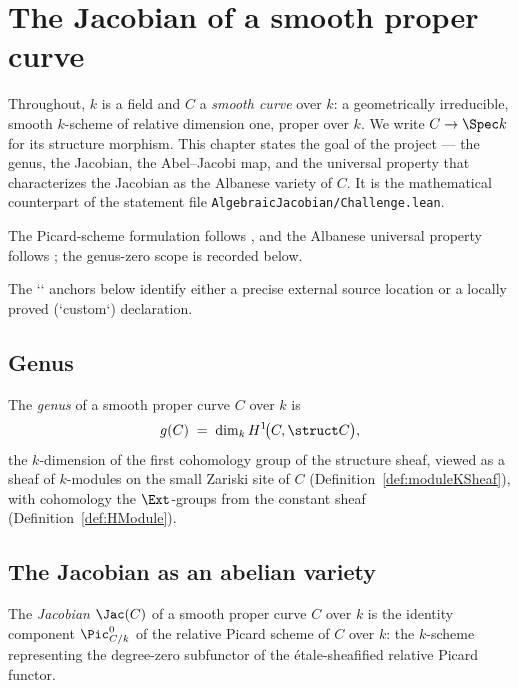 \chapter{The Jacobian of a smooth proper curve}
\label{chap:Challenge}

Throughout, \(k\) is a field and \(C\) a \emph{smooth curve} over \(k\): a geometrically
irreducible, smooth \(k\)-scheme of relative dimension one, proper over \(k\). We write
\(C \to \Spec k\) for its structure morphism. This chapter states the goal of the project — the
genus, the Jacobian, the Abel--Jacobi map, and the universal property that characterizes the
Jacobian as the Albanese variety of \(C\). It is the mathematical counterpart of the statement file
\texttt{AlgebraicJacobian/Challenge.lean}.

The Picard-scheme formulation follows \cite{kleiman-picard}, and the Albanese universal
property follows \cite{milne-av}; the genus-zero scope is recorded below.

The `\dcref` anchors below identify either a precise external source location or a locally
proved (`custom`) declaration.

\section{Genus}

\begin{definition}[Genus]
  \label{def:genus}
  \leanok
  The \emph{genus} of a smooth proper curve \(C\) over \(k\) is
  \[
    g(C) \;=\; \dim_k H^1\!\bigl(C, \struct C\bigr),
  \]
  the \(k\)-dimension of the first cohomology group of the structure sheaf, viewed as a sheaf
  of \(k\)-modules on the small Zariski site of \(C\) (Definition~\ref{def:moduleKSheaf}),
  with cohomology the \(\Ext\)-groups from the constant sheaf
  (Definition~\ref{def:HModule}).
\end{definition}

\section{The Jacobian as an abelian variety}

\begin{definition}[Jacobian]
 \label{def:jacobian}
  The \emph{Jacobian} \(\Jac(C)\) of a smooth proper curve \(C\) over \(k\) is the identity
  component \(\Pic^0_{C/k}\) of the relative Picard scheme of \(C\) over \(k\): the \(k\)-scheme
  representing the degree-zero subfunctor of the \'etale-sheafified relative Picard functor.
\end{definition}

